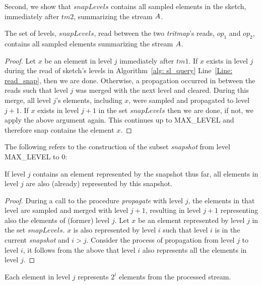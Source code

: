 Second, we show that $snapLevels$ contains all sampled elements in the sketch, immediately after $tm2$, summarizing the stream $\mathnormal{A}$.

\begin{lemma}\label{Lem: snap_no_miss}
The set of levels, $snapLevels$, read between the two \emph{tritmap}'s reads, $op_1$ and $op_2$, contains all sampled elements summarizing the stream $\mathnormal{A}$.
\end{lemma}
\begin{proof}
Let $x$ be an element in level $j$ immediately after $tm1$.
If $x$ exists in level $j$ during the read of sketch's levels in Algorithm~\ref{alg: sl_query} Line~\ref{Line: read_snap}, then we are done.
Otherwise, a propagation occurred in between the reads such that level $j$ was merged with the next level and cleared. During this merge, all level $j$'s elements, including $x$, were sampled and propagated to level $j+1$. If $x$ exists in level $j+1$ in the set $snapLevels$ then we are done, if not, we apply the above argument again. This continues up to MAX\_LEVEL and therefore snap contains the element $x$.
\end{proof}

The following refers to the construction of the subset \emph{snapshot} from level MAX\_LEVEL to 0:

\begin{lemma} \label{Lem: all_dup}
If level $j$ contains an element represented by the snapshot thus far, all elements in level $j$ are also (already) represented by this snapshot.
\end{lemma}
\begin{proof}
During a call to the procedure \emph{propagate} with level $j$, the elements in that level are sampled and merged with level $j+1$, resulting in level $j+1$ representing also the elements of (former) level $j$.
Let $x$ be an element represented by level $j$ in the set $snapLevels$.
$x$ is also represented by level $i$ such that level $i$ is in the current \emph{snapshot} and $i>j$. Consider the process of propagation from level $j$ to level $i$, it follows from the above that level $i$ also represents all the elements in level $j$.
\end{proof}

Each element in level $j$ represents $2^i$ elements from the processed stream.

